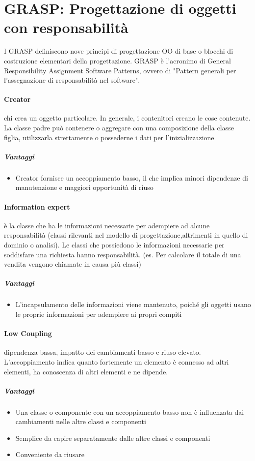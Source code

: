 \documentclass[12pt]{article}
\begin{document}
\section{GRASP: Progettazione di oggetti con responsabilità}
I GRASP definiscono nove principi di progettazione OO di base o blocchi di costruzione elementari della progettazione. GRASP è l'acronimo di General Responsibility Assignment Software Patterns, ovvero di "Pattern generali per l'assegnazione di responsabilità nel software". 
\paragraph{Creator} chi crea un oggetto particolare. In generale, i contenitori creano le cose contenute. La classe padre può contenere o aggregare con una composizione della classe figlia, utilizzarla strettamente o possederne i dati per l’inizializzazione
\subparagraph{Vantaggi}
\begin{itemize}
    \item Creator fornisce un accoppiamento basso, il che implica minori dipendenze di manutenzione e maggiori opportunità di riuso
\end{itemize}
\paragraph{Information expert} è la classe che ha le informazioni necessarie per adempiere ad alcune responsabilità (classi rilevanti nel modello di progettazione,altrimenti in quello di dominio o analisi). Le classi che possiedono le informazioni necessarie per soddisfare una richiesta hanno responsabilità. (es. Per calcolare il totale di una vendita vengono chiamate in causa più classi)
\subparagraph{Vantaggi}
\begin{itemize}
    \item L'incapsulamento delle informazioni viene mantenuto, poiché gli oggetti usano le proprie informazioni per adempiere ai propri compiti
\end{itemize}
\paragraph{Low Coupling} dipendenza bassa, impatto dei cambiamenti basso e riuso elevato. L’accoppiamento indica quanto fortemente un elemento è connesso ad altri elementi, ha conoscenza di altri elementi e ne dipende.
\subparagraph{Vantaggi}
\begin{itemize}
    \item Una classe o componente con un accoppiamento basso non è influenzata dai cambiamenti nelle altre classi e componenti
    \item Semplice da capire separatamente dalle altre classi e componenti
    \item Conveniente da riusare
\end{itemize}
\end{document}
